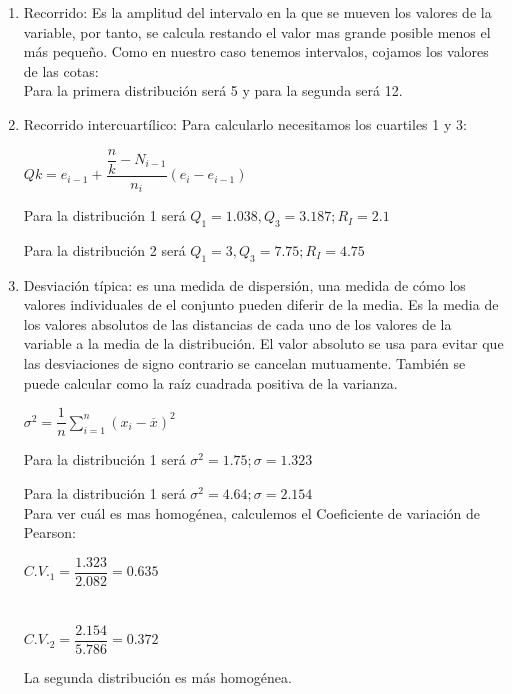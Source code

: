 \begin{enumerate}
	\item Recorrido: Es la amplitud del intervalo en la que se mueven los valores de la variable, por tanto, se calcula restando el valor mas grande posible menos el más pequeño. Como en nuestro caso tenemos intervalos, cojamos los valores de las cotas: \\
	Para la primera distribución será 5 y para la segunda será 12.
	\item Recorrido intercuartílico: Para calcularlo necesitamos los cuartiles 1 y 3:
	
	\begin{center}
		$Qk = e_{i-1} + \dfrac{\dfrac{n}{k} - N_{i-1}}{n_i}(e_i-e_{i-1})$
	\end{center}
	
	Para la distribución 1 será $Q_1 = 1.038, Q_3 = 3.187; R_I = 2.1$
	
	Para la distribución 2 será $Q_1 = 3, Q_3 = 7.75; R_I = 4.75$\\
	
	\item Desviación típica: es una medida de dispersión, una medida de cómo los valores individuales de el conjunto pueden diferir de la media. Es la media de los valores absolutos de las distancias de cada uno de los valores de la variable a la media de la distribución. El valor absoluto se usa para evitar que las desviaciones de signo contrario se cancelan mutuamente. También se puede calcular como la raíz cuadrada positiva de la varianza.
	\begin{center}
		$\sigma^2 = \dfrac{1}{n} \sum_{i=1}^{n}(x_i-\overline{x})^2$
	\end{center}
	
	Para la distribución 1 será $\sigma^2 = 1.75; \sigma = 1.323$
	
	Para la distribución 1 será $\sigma^2 = 4.64; \sigma = 2.154$\\
	
	
	Para ver cuál es mas homogénea, calculemos el Coeficiente de variación de Pearson:
	
	$C.V._1 = \dfrac{1.323}{2.082}= 0.635$ \\
	\\
	\\
	$C.V._2 = \dfrac{2.154}{5.786}= 0.372$
	
	La segunda distribución es más homogénea.
	
\end{enumerate}